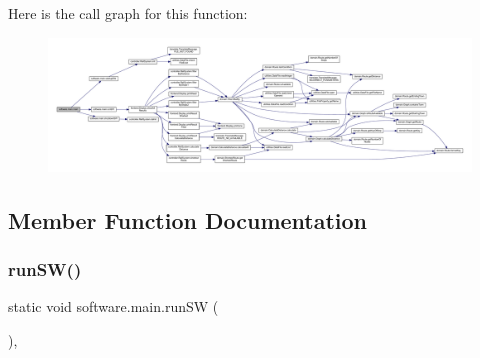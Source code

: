 Here is the call graph for this function\+:\nopagebreak
\begin{figure}[H]
\begin{center}
\leavevmode
\includegraphics[width=350pt]{classsoftware_1_1main_ac0127d8d05cf1b1a55d045818ce34a68_cgraph}
\end{center}
\end{figure}


\subsection{Member Function Documentation}
\mbox{\label{classsoftware_1_1main_a20702c213493bc103f21bea8d159f810}} 
\subsubsection{\texorpdfstring{run\+S\+W()}{runSW()}}
{\footnotesize\ttfamily static void software.\+main.\+run\+SW (\begin{DoxyParamCaption}{ }\end{DoxyParamCaption})\hspace{0.3cm}{\ttfamily [static]}, {\ttfamily [package]}}

